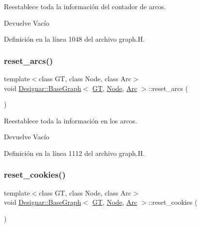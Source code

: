Reestablece toda la información del contador de arcos. 

\begin{DoxyReturn}{Devuelve}
Vacío 
\end{DoxyReturn}


Definición en la línea 1048 del archivo graph.\+H.

\mbox{\label{class_designar_1_1_base_graph_a6dc66191c2d752bf7f67a4522a7830e3}} 
\subsubsection{\texorpdfstring{reset\+\_\+arcs()}{reset\_arcs()}}
{\footnotesize\ttfamily template$<$class GT, class Node, class Arc$>$ \\
void \hyperlink{class_designar_1_1_base_graph}{Designar\+::\+Base\+Graph}$<$ \hyperlink{demo-buildgraph_8_c_a3001c40d2c31ca87ed96cd7d1334a55e}{GT}, \hyperlink{namespace_designar_a5af326c65aa2bd26b26c410f2030d09e}{Node}, \hyperlink{namespace_designar_a3f55fb5513d62ff47cbc8f72b8e95d6f}{Arc} $>$\+::reset\+\_\+arcs (\begin{DoxyParamCaption}{ }\end{DoxyParamCaption})\hspace{0.3cm}{\ttfamily [inline]}}



Reestablece toda la información en los arcos. 

\begin{DoxyReturn}{Devuelve}
Vacío 
\end{DoxyReturn}


Definición en la línea 1112 del archivo graph.\+H.

\mbox{\label{class_designar_1_1_base_graph_a96a630fd589c34e7e6242f4349606e1c}} 
\subsubsection{\texorpdfstring{reset\+\_\+cookies()}{reset\_cookies()}}
{\footnotesize\ttfamily template$<$class GT, class Node, class Arc$>$ \\
void \hyperlink{class_designar_1_1_base_graph}{Designar\+::\+Base\+Graph}$<$ \hyperlink{demo-buildgraph_8_c_a3001c40d2c31ca87ed96cd7d1334a55e}{GT}, \hyperlink{namespace_designar_a5af326c65aa2bd26b26c410f2030d09e}{Node}, \hyperlink{namespace_designar_a3f55fb5513d62ff47cbc8f72b8e95d6f}{Arc} $>$\+::reset\+\_\+cookies (\begin{DoxyParamCaption}{ }\end{DoxyParamCaption})\hspace{0.3cm}{\ttfamily [inline]}}




